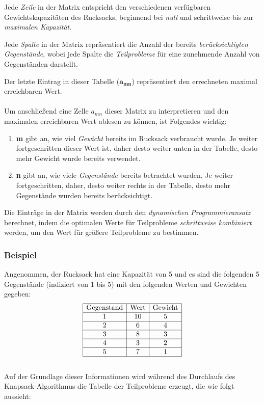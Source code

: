 \begin{itemize}
Jede \textit{Zeile} in der Matrix entspricht den verschiedenen verfügbaren Gewichtskapazitäten des Rucksacks, beginnend
bei \textit{null} und schrittweise bis zur \textit{maximalen Kapazität}.

Jede \textit{Spalte} in der Matrix repräsentiert die Anzahl der bereits \textit{berücksichtigten Gegenstände}, wobei jede
Spalte die \textit{Teilprobleme} für eine zunehmende Anzahl von Gegenständen darstellt.

Der letzte Eintrag in dieser Tabelle (\textbf{$\mathbf{a_{mn}}$}) repräsentiert den errechneten maximal erreichbaren Wert.\\
\\
Um anschließend eine Zelle \( a_{mn} \) dieser Matrix zu interpretieren und den maximalen erreichbaren Wert ablesen zu können, ist Folgendes wichtig:
\begin{enumerate}
\item \textbf{m} gibt an, wie viel \textit{Gewicht} bereits im Rucksack verbraucht wurde. Je weiter fortgeschritten dieser
Wert ist, daher desto weiter unten in der Tabelle, desto mehr Gewicht wurde bereits verwendet.
\item \textbf{n} gibt an, wie viele \textit{Gegenstände} bereits betrachtet wurden. Je weiter fortgeschritten, daher,
desto weiter rechts in der Tabelle, desto mehr Gegenstände wurden bereits berücksichtigt.
\end{enumerate}

Die Einträge in der Matrix werden durch den \textit{dynamischen Programmieransatz} berechnet, indem die optimalen Werte für
Teilprobleme \textit{schrittweise kombiniert} werden, um den Wert für größere Teilprobleme zu bestimmen.

\subsubsection*{Beispiel}
Angenommen, der Rucksack hat eine Kapazität von 5 und es sind die folgenden 5 Gegenstände (indiziert von 1 bis 5) mit den folgenden Werten und Gewichten gegeben:
\[
\begin{array}{|c|c|c|}
\hline
\text{Gegenstand} & \text{Wert} & \text{Gewicht} \\
\hline
1 & 10 & 5 \\
\hline
2 & 6 & 4 \\
\hline
3 & 8 & 3 \\
\hline
4 & 3 & 2 \\
\hline
5 & 7 & 1 \\
\hline
\end{array}
\]
\\
Auf der Grundlage dieser Informationen wird während des Durchlaufs des Knapsack-Algorithmus die Tabelle der Teilprobleme erzeugt, die wie folgt aussieht:


\end{itemize}
